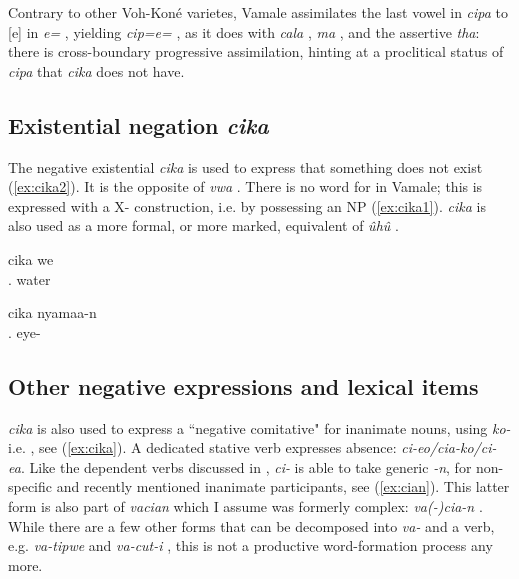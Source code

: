 Contrary to other Voh-Koné varietes, Vamale assimilates the last vowel in \textit{cipa} to [e] in \textit{e=} , yielding \textit{cip=e=} , as it does with \textit{cala} , \textit{ma} , and the assertive \textit{tha}: there is cross-boundary progressive assimilation, hinting at a proclitical status of \textit{cipa} that \textit{cika} does not have.

\subsection{Existential negation \textit{cika}}
The negative existential \textit{cika} is used to express that something does not exist (\ref{ex:cika2}). It is the opposite of \textit{vwa} . There is no word for  in Vamale; this is expressed with a  X- construction, i.e. by possessing an NP (\ref{ex:cika1}). \textit{cika} is also used as a more formal, or more marked, equivalent of \textit{ûhû} . %



\ea\label{ex:cika2}
\gll cika we\\ 
 . water\\ 
\glt {}
\z

\ea\label{ex:cika1}
\gll cika nyamaa-n\\ 
 . eye-\\ 
\glt {}
\z

\subsection{Other negative expressions and lexical items}
\label{ssec:other_neg}

\textit{cika} is also used to express a ``negative comitative" for inanimate nouns, using \textit{ko-}  i.e. , see (\ref{ex:cika}). A dedicated stative verb expresses absence: \textit{ci-eo/cia-ko/ci-ea}. Like the dependent verbs discussed in , \textit{ci-} is able to take generic \textit{-n}, for non-specific and recently mentioned inanimate participants, see (\ref{ex:cian}). This latter form is also part of \textit{vacian}  which I assume was formerly complex: \textit{va(-)cia-n} . While there are a few other forms that can be decomposed into \textit{va-} and a verb, e.g. \textit{va-tipwe}  and \textit{va-cut-i} , this is not a productive word-formation process any more. %

